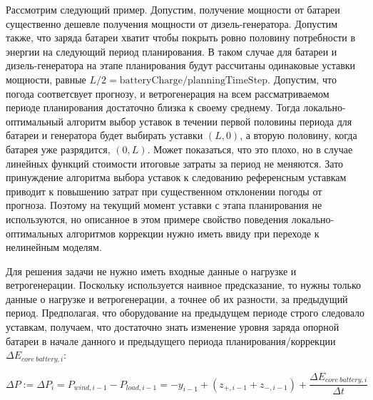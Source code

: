     Рассмотрим следующий пример.
    Допустим, получение мощности от батареи существенно дешевле получения мощности от дизель-генератора. Допустим также, что заряда батареи хватит чтобы покрыть ровно половину потребности в энергии на следующий период планирования.
    В таком случае для батареи и дизель-генератора на этапе планирования будут рассчитаны одинаковые уставки мощности, равные
    $L/2 = \text{batteryCharge} / \text{planningTimeStep}$.
    Допустим, что погода соответсвует прогнозу, и ветрогенерация на всем рассматриваемом периоде планирования достаточно близка к своему среднему.
    Тогда локально-оптимальный алгоритм выбор уставок в течении первой половины периода для батареи и генератора будет выбирать уставки $(L, 0)$, а вторую половину, когда батарея уже разрядится, $(0, L)$.
    Может показаться, что это плохо, но в случае линейных функций стоимости итоговые затраты за период не меняются. 
    Зато принуждение алгоритма выбора уставок к следованию референсным уставкам приводит к повышению затрат при существенном отклонении погоды от прогноза. 
    Поэтому на текущий момент уставки с этапа планирования не используются, но описанное в этом примере свойство поведения локально-оптимальных алгоритмов коррекции нужно иметь ввиду при переходе к нелинейным моделям.
    
    Для решения задачи не нужно иметь входные данные о нагрузке и ветрогенерации.
    Поскольку используется наивное предсказание, то нужны только данные о нагрузке и ветрогенерации, а точнее об их разности, за предыдущий период.
    Предполагая, что оборудование на предыдущем периоде строго следовало уставкам, получаем, что достаточно знать изменение  уровня заряда опорной батареи в начале данного и предыдущего периода планирования/коррекции 
    $\Delta E_{core~battery, i}$:
    
    \begin{equation}
    \label{f:dP}
    \Delta P := \Delta P_i =  
    P_{wind, i-1} - P_{load, i-1} 
    = -y_{i-1}  + (z_{+, i-1} + z_{-, i-1})
    + \frac{\Delta E_{core~battery, i}}{\Delta t} 
    \end{equation}
    
